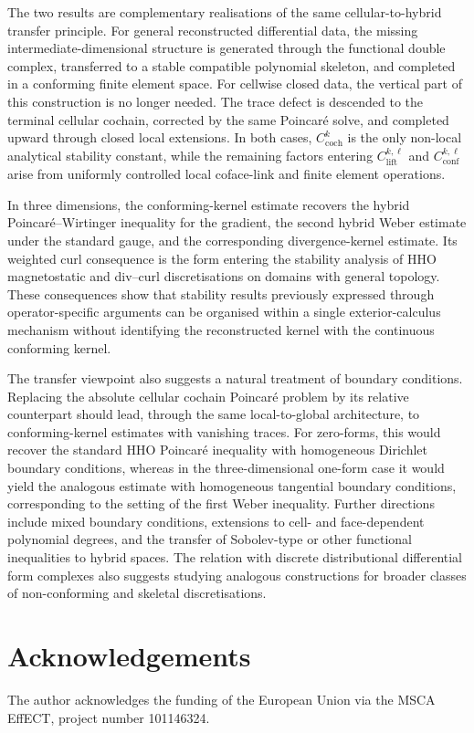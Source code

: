 \documentclass[a4paper,11pt]{article}
\theoremstyle{definition}
\begin{document}
The two results are complementary realisations of the same cellular-to-hybrid transfer principle.
For general reconstructed differential data, the missing intermediate-dimensional structure is generated through the functional double complex, transferred to a stable compatible polynomial skeleton, and completed in a conforming finite element space.
For cellwise closed data, the vertical part of this construction is no longer needed. The trace defect is descended to the terminal cellular cochain, corrected by the same Poincar\'e solve, and completed upward through closed local extensions.
In both cases, $C_{\mathrm{coch}}^k$ is the only non-local analytical stability constant, while the remaining factors entering $C_{\mathrm{lift}}^{k,\ell}$ and $C_{\mathrm{conf}}^{k,\ell}$ arise from uniformly controlled local coface-link and finite element operations.

In three dimensions, the conforming-kernel estimate recovers the hybrid Poincar\'e--Wirtinger inequality for the gradient, the second hybrid Weber estimate under the standard gauge, and the corresponding divergence-kernel estimate.
Its weighted curl consequence is the form entering the stability analysis of HHO magnetostatic and div--curl discretisations on domains with general topology.
These consequences show that stability results previously expressed through operator-specific arguments can be organised within a single exterior-calculus mechanism without identifying the reconstructed kernel with the continuous conforming kernel.

The transfer viewpoint also suggests a natural treatment of boundary conditions.
Replacing the absolute cellular cochain Poincar\'e problem by its relative counterpart should lead, through the same local-to-global architecture, to conforming-kernel estimates with vanishing traces.
For zero-forms, this would recover the standard HHO Poincar\'e inequality with homogeneous Dirichlet boundary conditions, whereas in the three-dimensional one-form case it would yield the analogous estimate with homogeneous tangential boundary conditions, corresponding to the setting of the first Weber inequality.
Further directions include mixed boundary conditions, extensions to cell- and face-dependent polynomial degrees, and the transfer of Sobolev-type or other functional inequalities to hybrid spaces.
The relation with discrete distributional differential form complexes also suggests studying analogous constructions for broader classes of non-conforming and skeletal discretisations.


\section*{Acknowledgements}
The author acknowledges the funding of the European Union via the MSCA EffECT, project number 101146324.




\end{document}
